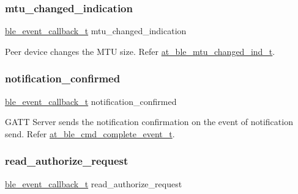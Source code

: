 \subsubsection{\texorpdfstring{mtu\_changed\_indication}{mtu\_changed\_indication}}
{\footnotesize\ttfamily \mbox{\hyperlink{ble__manager_8h_a04ce4bb8cb8282f2762e3924b1773cc9}{ble\+\_\+event\+\_\+callback\+\_\+t}} mtu\+\_\+changed\+\_\+indication}



Peer device changes the M\+TU size. Refer \mbox{\hyperlink{structat__ble__mtu__changed__ind__t}{at\+\_\+ble\+\_\+mtu\+\_\+changed\+\_\+ind\+\_\+t}}. 

\mbox{\label{structble__gatt__server__event__cb_aba03ebc64859db1ac8bf0882dc6acac2}} 
\subsubsection{\texorpdfstring{notification\_confirmed}{notification\_confirmed}}
{\footnotesize\ttfamily \mbox{\hyperlink{ble__manager_8h_a04ce4bb8cb8282f2762e3924b1773cc9}{ble\+\_\+event\+\_\+callback\+\_\+t}} notification\+\_\+confirmed}



G\+A\+TT Server sends the notification confirmation on the event of notification send. Refer \mbox{\hyperlink{structat__ble__cmd__complete__event__t}{at\+\_\+ble\+\_\+cmd\+\_\+complete\+\_\+event\+\_\+t}}. 

\mbox{\label{structble__gatt__server__event__cb_a73149ea7b859fbb1183fb8ab5aa3ad79}} 
\subsubsection{\texorpdfstring{read\_authorize\_request}{read\_authorize\_request}}
{\footnotesize\ttfamily \mbox{\hyperlink{ble__manager_8h_a04ce4bb8cb8282f2762e3924b1773cc9}{ble\+\_\+event\+\_\+callback\+\_\+t}} read\+\_\+authorize\+\_\+request}



